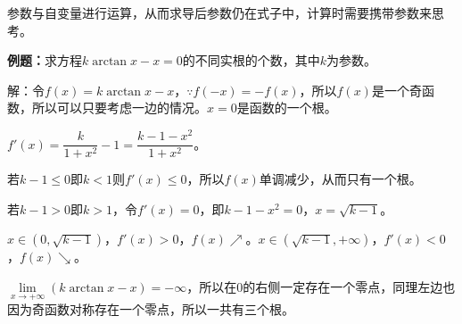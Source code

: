 参数与自变量进行运算，从而求导后参数仍在式子中，计算时需要携带参数来思考。

\textbf{例题：}求方程$k\arctan x-x=0$的不同实根的个数，其中$k$为参数。

解：令$f(x)=k\arctan x-x$$，\because f(-x)=-f(x)$，所以$f(x)$是一个奇函数，所以可以只要考虑一边的情况。$x=0$是函数的一个根。

$f'(x)=\dfrac{k}{1+x^2}-1=\dfrac{k-1-x^2}{1+x^2}$。

若$k-1\leqslant0$即$k<1$则$f'(x)\leqslant0$，所以$f(x)$单调减少，从而只有一个根。

若$k-1>0$即$k>1$，令$f'(x)=0$，即$k-1-x^2=0$，$x=\sqrt{k-1}$。

$x\in(0,\sqrt{k-1})$，$f'(x)>0$，$f(x)\nearrow$。$x\in(\sqrt{k-1},+\infty)$，$f'(x)<0$，$f(x)\searrow$。

$\lim\limits_{x\to+\infty}(k\arctan x-x)=-\infty$，所以在0的右侧一定存在一个零点，同理左边也因为奇函数对称存在一个零点，所以一共有三个根。
